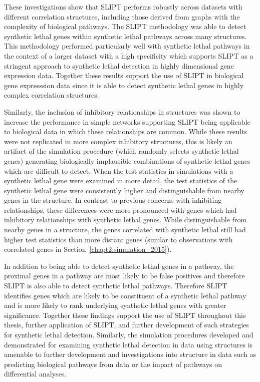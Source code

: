 These investigations show that \gls{SLIPT} performs robustly across datasets with different correlation structures, including those derived from \glspl{graph} with the complexity of biological pathways. The \gls{SLIPT} methodology was able to detect \gls{synthetic lethal} genes within \gls{synthetic lethal} pathways across many  structures. This methodology performed particularly well with \gls{synthetic lethal} pathways in the context of a larger dataset with a high specificity which supports \gls{SLIPT} as a stringent approach to \gls{synthetic lethal} detection in highly dimensional \gls{gene expression} data. Together these results support the use of \gls{SLIPT} in biological gene expresssion data since it is able to detect \gls{synthetic lethal} genes in highly complex correlation structures.

Similarly, the inclusion of inhibitory relationships in  structures was shown to increase the performance in simple networks supporting \gls{SLIPT} being applicable to biological data in which these relationships are common. While these results were not replicated in more complex inhibitory  structures, this is likely an artifact of the simulation procedure (which randomly selects \gls{synthetic lethal} genes) generating biologically implausible combinations of \gls{synthetic lethal} genes which are difficult to detect. When the test statistics in simulations with a \gls{synthetic lethal} gene were examined in more detail, the test statistics of the \gls{synthetic lethal} gene were consistently higher and distinguishable from nearby genes in the  structure. In contrast to previous concerns with inhibiting relationships, these differences were more pronounced with genes which had inhibitory relationships with \gls{synthetic lethal} genes. While distinguishable from nearby genes in a  structure, the genes correlated with \gls{synthetic lethal} still had higher test statistics than more distant genes (similar to observations with correlated genes in Section~\ref{chapt2:simulation_2015}).

In addition to being able to detect \gls{synthetic lethal} genes in a pathway, the proximal genes in a pathway are most likely to be false positives and therefore \gls{SLIPT} is also able to detect \gls{synthetic lethal} pathways. Therefore \gls{SLIPT} identifies genes which are likely to be constituent of a \gls{synthetic lethal} pathway and is more likely to rank underlying \gls{synthetic lethal} genes with greater significance. Together these findings support the use of \gls{SLIPT} throughout this thesis, further application of \gls{SLIPT}, and further development of such strategies for \gls{synthetic lethal} detection. Similarly, the simulation procedures developed and demonstrated for examining \gls{synthetic lethal} detection in  data using  structures is amenable to further development and investigations into  structure in  data such as predicting biological pathways from  data or the impact of pathways on differential  analyses.


